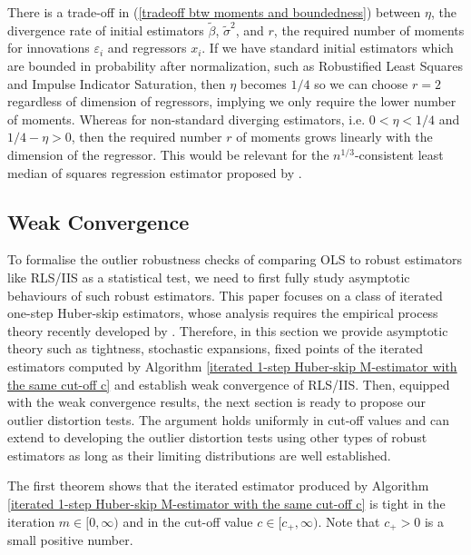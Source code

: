 \documentclass[11pt, letterpaper]{article}
\numberwithin{algorithm}{section}
\numberwithin{assumption}{section}
\numberwithin{lemma}{section}
\numberwithin{theorem}{section}
\numberwithin{corollary}{section}
\numberwithin{remark}{section}
\numberwithin{equation}{section}
\numberwithin{figure}{section}
\numberwithin{table}{section}
\begin{document}
There is a trade-off in (\ref{tradeoff btw moments and boundedness}) between $\eta$, the divergence rate of initial estimators $\widetilde{\beta}$, $\widetilde{\sigma}^{2}$, and $r$, the required number of moments for innovations $\varepsilon_{i}$ and regressors $x_{i}$. If we have standard initial estimators which are bounded in probability after normalization, such as Robustified Least Squares and Impulse Indicator Saturation, then $\eta$ becomes $1/4$ so we can choose $r = 2$ regardless of dimension of regressors, implying we only require the lower number of moments. Whereas for non-standard diverging estimators, i.e. $0 < \eta < 1/4$ and $1/4 - \eta > 0$, then the required number $r$ of moments grows linearly with the dimension of the regressor. This would be relevant for the $n^{1/3}$-consistent least median of squares regression estimator proposed by \cite{rousseeuw1984least}.


\subsection{Weak Convergence} \label{sec_weak convergence}
To formalise the outlier robustness checks of comparing OLS to robust estimators like RLS/IIS as a statistical test, we need to first fully study asymptotic behaviours of such robust estimators. This paper focuses on a class of iterated one-step Huber-skip estimators, whose analysis requires the empirical process theory recently developed by \cite{berenguer2019analysis}. Therefore, in this section we provide asymptotic theory such as tightness, stochastic expansions, fixed points of the iterated estimators computed by Algorithm \ref{iterated 1-step Huber-skip M-estimator with the same cut-off c} and establish weak convergence of RLS/IIS. Then, equipped with the weak convergence results, the next section is ready to propose our outlier distortion tests. The argument holds uniformly in cut-off values and can extend to developing the outlier distortion tests using other types of robust estimators as long as their limiting distributions are well established.

The first theorem shows that the iterated estimator produced by Algorithm \ref{iterated 1-step Huber-skip M-estimator with the same cut-off c} is tight in the iteration $m \in [0, \infty)$ and in the cut-off value $c \in [c_{+}, \infty)$. Note that $c_{+} > 0$ is a small positive number.
\end{document}
